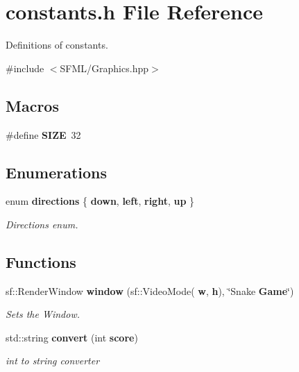 \section{constants.\+h File Reference}
\label{constants_8h}


Definitions of constants.  


{\ttfamily \#include $<$S\+F\+M\+L/\+Graphics.\+hpp$>$}\newline
\subsection*{Macros}
\begin{DoxyCompactItemize}
\item 
\#define \textbf{ S\+I\+ZE}~32
\end{DoxyCompactItemize}
\subsection*{Enumerations}
\begin{DoxyCompactItemize}
\item 
enum \textbf{ directions} \{ \textbf{ down}, 
\textbf{ left}, 
\textbf{ right}, 
\textbf{ up}
 \}
\begin{DoxyCompactList}\small\item\em Directions enum. \end{DoxyCompactList}\end{DoxyCompactItemize}
\subsection*{Functions}
\begin{DoxyCompactItemize}
\item 
sf\+::\+Render\+Window \textbf{ window} (sf\+::\+Video\+Mode(\textbf{ w}, \textbf{ h}), \char`\"{}Snake \textbf{ Game}\char`\"{})
\begin{DoxyCompactList}\small\item\em Sets the Window. \end{DoxyCompactList}\item 
std\+::string \textbf{ convert} (int \textbf{ score})
\begin{DoxyCompactList}\small\item\em int to string converter \end{DoxyCompactList}\end{DoxyCompactItemize}
